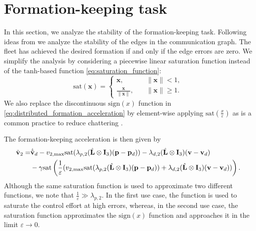 \section{Formation-keeping task}
\vspace{-2mm}
In this section, we analyze the stability of the formation-keeping task. Following ideas from \cite{restrepo_tracking--formation_2022} we analyze the stability of the edges in the communication graph. The fleet has achieved the desired formation if and only if the edge errors are zero. We simplify the analysis by considering a piecewise linear saturation function instead of the $\mathrm{tanh}$-based function \eqref{eq:saturation_function}:
\begin{equation}
    \mathrm{sat}(\mathbf{x}) = \begin{cases}
        \mathbf{x},\quad &\|\mathbf{x}\| < 1,\\
        \frac{\mathbf{x}}{\|\mathbf{x}\|}, \quad &\|\mathbf{x}\| \geq 1.
    \end{cases}
\end{equation}
We also replace the discontinuous $\mathrm{sign}(x)$ function in \eqref{eq:distributed_formation_acceleration} by element-wise applying $\mathrm{sat}(\tfrac{x}{\varepsilon})$ as is a common practice to reduce chattering \citep{khalil_nonlinear_2002}.

The formation-keeping acceleration is then given by
\begin{equation}
\begin{split}
     \dot{\mathbf{v}}_2 = &\dot{\Tilde{\mathbf{v}}}_{d} - v_{2,\max}\mathrm{sat}(\lambda_{p,2}(\hat{\mathbf{L}}\otimes \mathbf{I}_3)(\mathbf{p}-\mathbf{p}_d)) - \lambda_{d,2}(\hat{\mathbf{L}}\otimes \mathbf{I}_3)(\mathbf{v} - \mathbf{v}_d)  \\
     &-\gamma \mathrm{sat}\left(\frac{1}{\varepsilon}(v_{2,\max}\mathrm{sat}(\lambda_{p,2}(\hat{\mathbf{L}}\otimes \mathbf{I}_3)(\mathbf{p}-\mathbf{p}_d)) + \lambda_{d,2}(\hat{\mathbf{L}}\otimes \mathbf{I}_3)(\mathbf{v} - \mathbf{v}_d))\right).
\end{split}
\end{equation}
Although the same saturation function is used to approximate two different functions, we note that $\tfrac{1}{\varepsilon}\gg \lambda_{p,2}$. In the first use case, the function is used to saturate the control effort at high errors, whereas, in the second use case, the saturation function approximates the $\mathrm{sign}(x)$ function and approaches it in the limit $\varepsilon \rightarrow 0$.

